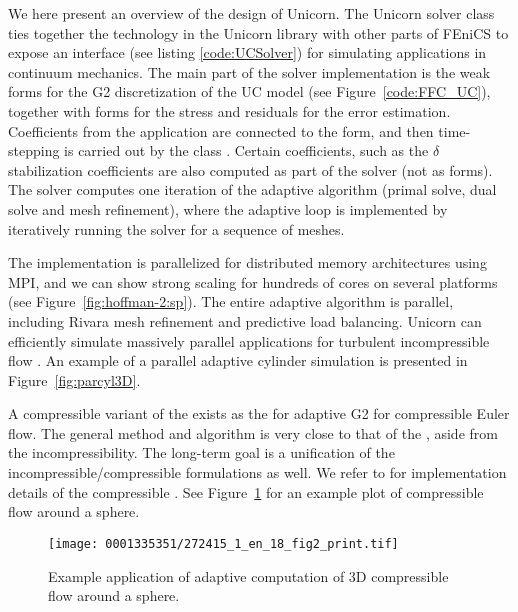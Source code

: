 We here present an overview of the design of Unicorn. The Unicorn
solver class  ties together the technology in the
Unicorn library with other parts of FEniCS to expose an interface (see
listing \ref{code:UCSolver}) for simulating applications in continuum
mechanics. The main part of the solver implementation is the weak
forms for the G2 discretization of the UC model (see
Figure~\ref{code:FFC_UC}), together with forms for the stress and
residuals for the error estimation. Coefficients from the application
are connected to the form, and then time-stepping is carried out by
the class . Certain coefficients, such as the
$\delta$ stabilization coefficients are also computed as part of the
solver (not as forms). The solver computes one iteration of the
adaptive algorithm (primal solve, dual solve and mesh refinement),
where the adaptive loop is implemented by iteratively running the
solver for a sequence of meshes.


The  implementation is parallelized for distributed
memory architectures using MPI, and we can show strong scaling for
hundreds of cores on several platforms (see
Figure~\ref{fig:hoffman-2:sp}). The entire adaptive algorithm is
parallel, including Rivara mesh refinement and \apriori{} predictive
load balancing. Unicorn can efficiently simulate massively parallel
applications for turbulent incompressible flow
\citep{JanssonHoffmanJansson2010, Jansson2011}. An example of a
parallel adaptive cylinder simulation is presented in
Figure~\ref{fig:parcyl3D}.


A compressible variant of the  exists as the
 for adaptive G2 for compressible Euler flow. The
general method and algorithm is very close to that of the
, aside from the incompressibility. The long-term goal
is a unification of the incompressible/compressible formulations as
well. We refer to \citet{Nazarov2009} for implementation details of
the compressible . See Figure~\ref{fig:compr3D} for an
example plot of compressible flow around a sphere.

\begin{figure}[!b]
  \centering
  \texttt{[image: 0001335351/272415\_1\_en\_18\_fig2\_print.tif]}
  \caption{Example application of adaptive computation of 3D compressible
    flow around a sphere.}\label{fig:compr3D}\vspace*{5pt}
\end{figure}

